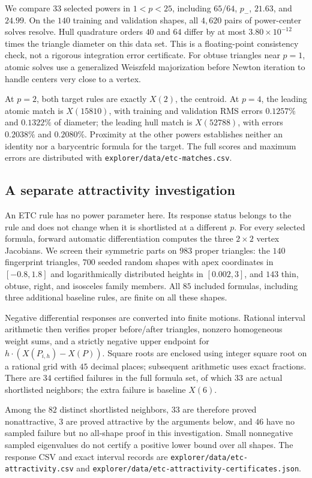 \documentclass[11pt]{article}
\theoremstyle{definition}
\newcommand{\pn}{p_{-}}
\newcommand{\pathcode}[1]{\nolinkurl{#1}}
\begin{document}
We compare $33$ selected powers in $1<p<25$, including $65/64$, $\pn$,
$21.63$, and $24.99$. On the $140$ training and validation shapes, all
$4{,}620$ pairs of power-center solves resolve. Hull quadrature orders $40$
and $64$ differ by at most $3.80\times10^{-12}$ times the triangle diameter
on this data set. This is a floating-point consistency check, not a
rigorous integration error certificate. For obtuse triangles near $p=1$,
atomic solves use a generalized Weiszfeld majorization before Newton
iteration to handle centers very close to a vertex.

At $p=2$, both target rules are exactly $X(2)$, the centroid. At $p=4$,
the leading atomic match is $X(15810)$, with training and validation RMS
errors $0.1257\%$ and $0.1322\%$ of diameter; the leading hull match is
$X(52788)$, with errors $0.2038\%$ and $0.2080\%$. Proximity at the other
powers establishes neither an identity nor a barycentric formula for
the target. The full scores and maximum errors are distributed with
\pathcode{explorer/data/etc-matches.csv}.

\subsection{A separate attractivity investigation}
An ETC rule has no power parameter here. Its response status belongs to
the rule and does not change when it is shortlisted at a different $p$.
For every selected formula, forward automatic differentiation computes
the three $2\times2$ vertex Jacobians. We screen their symmetric parts on
$983$ proper triangles: the $140$ fingerprint triangles, $700$ seeded
random shapes with apex coordinates in $[-0.8,1.8]$ and logarithmically
distributed heights in $[0.002,3]$, and $143$ thin, obtuse, right, and
isosceles family members. All $85$ included formulas, including three
additional baseline rules, are finite on all these shapes.

Negative differential responses are converted into finite motions.
Rational interval arithmetic then verifies proper before/after triangles,
nonzero homogeneous weight sums, and a strictly negative upper endpoint
for $h\cdot(X(P_{i,h})-X(P))$. Square roots are enclosed using integer square
root on a rational grid with $45$ decimal places; subsequent arithmetic
uses exact fractions. There are $34$ certified failures in the full
formula set, of which $33$ are actual shortlisted neighbors; the extra
failure is baseline $X(6)$.

Among the $82$ distinct shortlisted neighbors, $33$ are therefore proved
nonattractive, $3$ are proved attractive by the arguments below, and $46$
have no sampled failure but no all-shape proof in this investigation.
Small nonnegative sampled eigenvalues do not certify a positive lower
bound over all shapes. The response CSV and exact interval records are
\pathcode{explorer/data/etc-attractivity.csv} and
\pathcode{explorer/data/etc-attractivity-certificates.json}.
\end{document}
